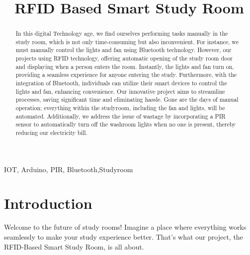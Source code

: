 \documentclass[conference]{IEEEtran}
\begin{document}
\title{RFID Based Smart Study Room}

\author{
}

\maketitle
\begin{abstract}
In this digital  Technology age, we find ourselves performing tasks manually in the study room, which is not only time-consuming but also inconvenient. For instance, we must manually control the lights and fan using Bluetooth technology. However, our projects using RFID technology, offering automatic opening of the study room door and displaying when a person enters the room. Instantly, the lights and fan turn on, providing a seamless experience for anyone entering the study. Furthermore, with the integration of Bluetooth, individuals can utilize their smart devices to control the lights and fan, enhancing convenience. Our innovative project aims to streamline processes, saving significant time and eliminating hassle. Gone are the days of manual operation; everything within the studyroom, including the fan and lights, will be automated. Additionally, we address the issue of wastage by incorporating a PIR sensor to automatically turn off the washroom lights when no one is present, thereby reducing our electricity bill.
\end{abstract}
\begin{IEEEkeywords}
IOT, Arduino, PIR, Bluetooth,Studyroom
\end{IEEEkeywords}

\section{Introduction}

Welcome to the future of study rooms! Imagine a place where everything works seamlessly to make your study experience better. That's what our project, the RFID-Based Smart Study Room, is all about.
\end{document}
